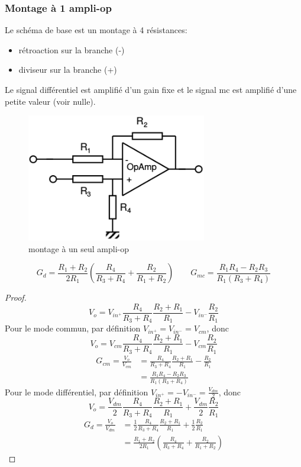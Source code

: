 \subsubsection{Montage à 1 ampli-op}
\begin{minipage}[t]{0.55\textwidth}
	Le schéma de base est un montage à 4 résistances:
	\begin{itemize}
		\item rétroaction sur la branche (-)
		\item diviseur sur la branche (+)
	\end{itemize}
	Le signal différentiel est amplifié d'un gain fixe et le signal mc est amplifié d'une petite valeur (voir nulle).
\end{minipage}
\begin{minipage}[t]{.45\textwidth}
	\vspace{-2cm}
	\begin{figure}[H]
		\centering
		\includegraphics[width=0.7\textwidth,height=10\baselineskip,keepaspectratio]{ch4/image1} 
		\caption{montage à un seul ampli-op} 
	\end{figure}
\end{minipage}
\[G_d = \frac{R_1+R_2}{2R_1}\left(\frac{R_4}{R_3+R_4}+\frac{R_2}{R_1+R_2}\right)\qquad G_{mc}=\frac{R_1R_4-R_2R_3}{R_1(R_3+R_4)}\]
\begin{proof}
	\[V_o = V_{in^+}\frac{R_4}{R_3+R_4}\frac{R_2+R_1}{R_1}-V_{in^-}\frac{R_2}{R_1}\]
	Pour le mode commun, par définition \(V_{in^+} = V_{in^-} = V_{cm}\), donc
	\[V_o = V_{cm}\frac{R_4}{R_3+R_4}\frac{R_2+R_1}{R_1}-V_{cm}\frac{R_2}{R_1}\]
	\begin{align*}
		G_{cm}=\frac{V_o}{V_{cm}} &= \frac{R_4}{R_3+R_4}\frac{R_2+R_1}{R_1}-\frac{R_2}{R_1}\\
		&= \frac{R_1R_4-R_2R_3}{R_1(R_3+R_4)}
	\end{align*}
	Pour le mode différentiel, par définition \(V_{in^+} = -V_{in^-}=\frac{V_{dm}}{2}\), donc
	\[V_o = \frac{V_{dm}}{2}\frac{R_4}{R_3+R_4}\frac{R_2+R_1}{R_1}+\frac{V_{dm}}{2}\frac{R_2}{R_1}\]
	\begin{align*}
		G_{d} = \frac{V_o}{V_{dm}} &= \frac{1}{2}\frac{R_4}{R_3+R_4}\frac{R_2+R_1}{R_1} + \frac{1}{2}\frac{R_2}{R_1}\\
		&= \frac{R_1+R_2}{2R_1}\left(\frac{R_4}{R_3+R_4}+\frac{R_2}{R_1+R_2}\right)
	\end{align*} 
\end{proof}
